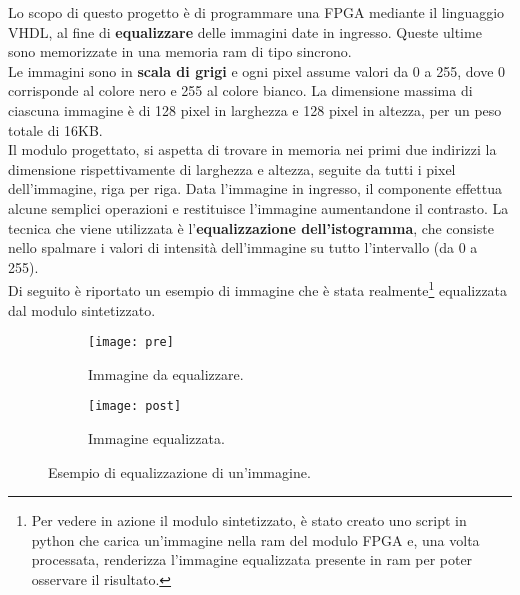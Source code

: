 Lo scopo di questo progetto è di programmare una FPGA mediante il linguaggio VHDL, al fine di \textbf{equalizzare} delle immagini date in ingresso. Queste ultime sono memorizzate in una memoria ram di tipo sincrono.\\
Le immagini sono in \textbf{scala di grigi} e ogni pixel assume valori da 0 a 255, dove 0 corrisponde al colore nero e 255 al colore bianco. La dimensione massima di ciascuna immagine è di 128 pixel in larghezza e 128 pixel in altezza, per un peso totale di 16KB.\\
Il modulo progettato, si aspetta di trovare in memoria nei primi due indirizzi la dimensione rispettivamente di larghezza e altezza, seguite da tutti i pixel dell'immagine, riga per riga. Data l'immagine in ingresso, il componente effettua alcune semplici operazioni e restituisce l'immagine aumentandone il contrasto. La tecnica che viene utilizzata è l'\textbf{equalizzazione dell'istogramma}, che consiste nello spalmare i valori di intensità dell'immagine su tutto l'intervallo  (da 0 a 255).\\
Di seguito è riportato un esempio di immagine che è stata realmente\footnote{Per vedere in azione il modulo sintetizzato, è stato creato uno script in python che carica un'immagine nella ram del modulo FPGA e, una volta processata, renderizza l'immagine equalizzata presente in ram per poter osservare il risultato.} equalizzata dal modulo sintetizzato.

\begin{figure}[h!]
  \centering
  \begin{subfigure}[b]{0.4\linewidth}
    \texttt{[image: pre]}
    \caption{Immagine da equalizzare.}
  \end{subfigure}
  \begin{subfigure}[b]{0.4\linewidth}
    \texttt{[image: post]}
    \caption{Immagine equalizzata.}
  \end{subfigure}
  \caption{Esempio di equalizzazione di un'immagine.}
  \label{fig:equalized}
\end{figure}
 
